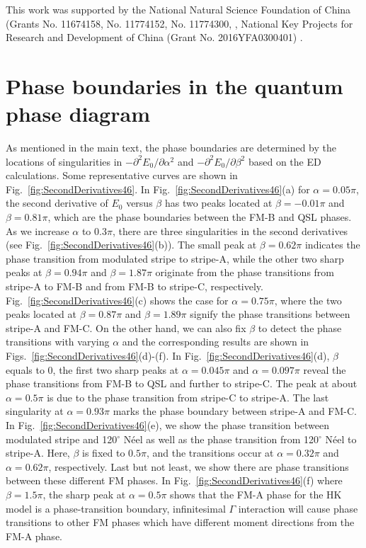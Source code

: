 \documentclass[aps,prb,reprint,amsfonts,amsmath,amssymb,showpacs,groupedaddress,superscriptaddress]{revtex4-1}
\begin{document}
\begin{acknowledgments}
This work was supported by the National Natural Science Foundation of China (Grants No. 11674158, No. 11774152, No. 11774300, , National Key Projects for Research and Development of China (Grant No. 2016YFA0300401) .
\end{acknowledgments}

\appendix

\section{\label{apx:PhaseBoundary}Phase boundaries in the  quantum phase diagram}

As mentioned in the main text, the phase boundaries are determined by the locations of singularities in $-\partial^{2} E_{0} / \partial \alpha^{2}$ and $-\partial^{2} E_{0} / \partial \beta^{2}$ based on the ED calculations. Some representative curves are shown in Fig.~\ref{fig:SecondDerivatives46}. In Fig.~\ref{fig:SecondDerivatives46}(a) for $\alpha=0.05\pi$, the second derivative of $E_0$ versus $\beta$ has two peaks located at $\beta=-0.01\pi$ and $\beta=0.81\pi$, which are the phase boundaries between the FM-B and QSL phases. As we increase $\alpha$ to $0.3\pi$, there are three singularities in the second derivatives (see Fig.~\ref{fig:SecondDerivatives46}(b)). The small peak at $\beta=0.62\pi$ indicates the phase transition from modulated stripe to stripe-A, while the other two sharp peaks at $\beta=0.94\pi$ and $\beta=1.87\pi$ originate from the phase transitions from stripe-A to FM-B and from FM-B to stripe-C, respectively. Fig.~\ref{fig:SecondDerivatives46}(c) shows the case for $\alpha=0.75\pi$, where the two peaks located at $\beta=0.87\pi$ and $\beta=1.89\pi$ signify the phase transitions between stripe-A and FM-C. On the other hand, we can also fix $\beta$ to detect the phase transitions with varying $\alpha$ and the corresponding results are shown in Figs.~\ref{fig:SecondDerivatives46}(d)-(f). In Fig.~\ref{fig:SecondDerivatives46}(d), $\beta$ equals to $0$, the first two sharp peaks at $\alpha=0.045\pi$ and $\alpha=0.097\pi$ reveal the phase transitions from FM-B to QSL and further to stripe-C. The peak at about $\alpha=0.5\pi$ is due to the phase transition from stripe-C to stripe-A. The last singularity at $\alpha=0.93\pi$ marks the phase boundary between stripe-A and FM-C. In Fig.~\ref{fig:SecondDerivatives46}(e), we show the phase transition between modulated stripe and 120$^\circ$ N\'{e}el as well as the phase transition from 120$^\circ$ N\'{e}el to stripe-A. Here, $\beta$ is fixed to $0.5\pi$, and the transitions occur at $\alpha=0.32\pi$ and $\alpha=0.62\pi$, respectively. Last but not least, we show there are phase transitions between these different FM phases. In Fig.~\ref{fig:SecondDerivatives46}(f) where $\beta=1.5\pi$, the sharp peak at $\alpha=0.5\pi$ shows that the FM-A phase for the HK model is a phase-transition boundary, infinitesimal $\Gamma$ interaction will cause phase transitions to other FM phases which have different moment directions from the FM-A phase.
\end{document}
